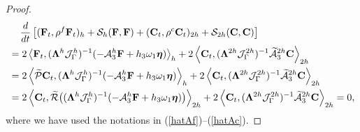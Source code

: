 \begin{proof}
\begin{align*}\label{semi_energy_2}
&\hspace{0.4cm}\frac{d}{dt}\left[({\bf F}_t,\rho^f {\bf F}_t)_{h} + \mathcal{S}_{h}({\bf F},{\bf F}) + ({\bf C}_t,\rho^{c} {\bf C}_t)_{2h} + \mathcal{S}_{2h}({\bf C},{\bf C}) \right]   \nonumber\\
& = 2\left<{\bf F}_t,(\bm{\Lambda}^{h}\mathcal{J}^h_\Gamma)^{-1}(-\mathcal{A}_3^h{\bf F}+h_3\omega_1{\bm \eta})\right>_{h}+ 2\left<{\bf C}_t,(\bm{\Lambda}^{2h}\mathcal{J}^{2h}_\Gamma)^{-1}\wt{\mathcal{A}}_3^{2h}{\bf C}\right>_{2h} \nonumber\\
& = 2\left<\wt{\mathcal{P}}{\bf C}_t,(\bm{\Lambda}^{h}\mathcal{J}^h_\Gamma)^{-1}(-\mathcal{A}_3^h{\bf F}+h_3\omega_1{\bm \eta})\right>_{h}+ 2\left<{\bf C}_t, (\bm{\Lambda}^{2h}\mathcal{J}^{2h}_\Gamma)^{-1}\wt{\mathcal{A}}_3^{2h}{\bf C}\right>_{2h} \nonumber\\
& = 2\left<{\bf C}_t,\wt{\mathcal{R}}\big((\bm{\Lambda}^{h}\mathcal{J}^h_\Gamma)^{-1}(-\mathcal{A}_3^h{\bf F}+h_3\omega_1{\bm \eta})\big)\right>_{2h}+ 2\left<{\bf C}_t,(\bm{\Lambda}^{2h}\mathcal{J}^{2h}_\Gamma)^{-1}\wt{\mathcal{A}}_3^{2h}{\bf C}\right>_{2h} = 0,
\end{align*}
where we have used the notations in (\ref{hatAf})--(\ref{hatAc}).
\end{proof}
